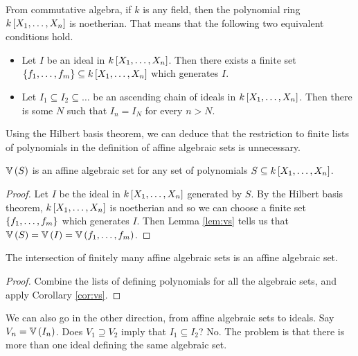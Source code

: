 \pagebreak

\begin{theorem}
From commutative algebra, if $ k $ is any field, then the polynomial ring $ k\sbr{X_1, \dots, X_n} $ is noetherian. That means that the following two equivalent conditions hold.
\begin{itemize}
\item Let $ I $ be an ideal in $ k\sbr{X_1, \dots, X_n} $. Then there exists a finite set $ \cbr{f_1, \dots, f_m} \subseteq k\sbr{X_1, \dots, X_n} $ which generates $ I $.
\item Let $ I_1 \subseteq I_2 \subseteq \dots $ be an ascending chain of ideals in $ k\sbr{X_1, \dots, X_n} $. Then there is some $ N $ such that $ I_n = I_N $ for every $ n > N $.
\end{itemize}
\end{theorem}

Using the Hilbert basis theorem, we can deduce that the restriction to finite lists of polynomials in the definition of affine algebraic sets is unnecessary.

\begin{corollary}
\label{cor:vs}
$ \VV\br{S} $ is an affine algebraic set for any set of polynomials $ S \subseteq k\sbr{X_1, \dots, X_n} $.
\end{corollary}

\begin{proof}
Let $ I $ be the ideal in $ k\sbr{X_1, \dots, X_n} $ generated by $ S $. By the Hilbert basis theorem, $ k\sbr{X_1, \dots, X_n} $ is noetherian and so we can choose a finite set $ \cbr{f_1, \dots, f_m} $ which generates $ I $. Then Lemma \ref{lem:vs} tells us that $ \VV\br{S} = \VV\br{I} = \VV\br{f_1, \dots, f_m} $.
\end{proof}

\begin{corollary}
The intersection of finitely many affine algebraic sets is an affine algebraic set.
\end{corollary}

\begin{proof}
Combine the lists of defining polynomials for all the algebraic sets, and apply Corollary \ref{cor:vs}.
\end{proof}

We can also go in the other direction, from affine algebraic sets to ideals. Say $ V_n = \VV\br{I_n} $. Does $ V_1 \supseteq V_2 $ imply that $ I_1 \subseteq I_2 $? No. The problem is that there is more than one ideal defining the same algebraic set.

